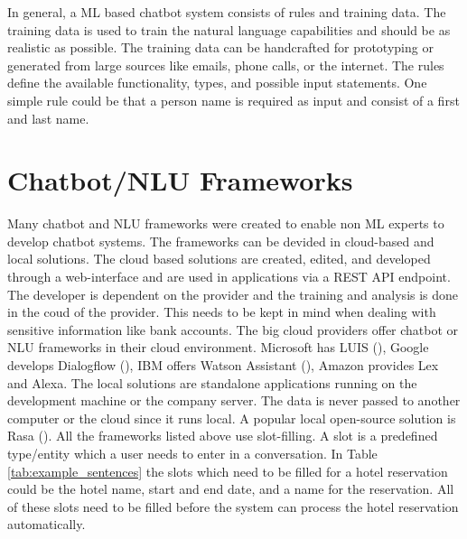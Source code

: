 In general, a ML based chatbot system consists of rules and training data.
The training data is used to train the natural language capabilities and 
should be as realistic as possible.
The training data can be handcrafted for prototyping or generated from large sources like emails, phone calls,
or the internet.
The rules define the available functionality, types, and possible input statements.
One simple rule could be that a person name is required as input and consist of a first and last name.


\section{Chatbot/NLU Frameworks}
Many chatbot and NLU frameworks were created to enable non ML experts to 
develop chatbot systems.
The frameworks can be devided in cloud-based and local solutions.
The cloud based solutions are created, edited, and developed through a web-interface 
and are used in applications via a REST API endpoint.
The developer is dependent on the provider and the training and analysis is done 
in the coud of the provider. This needs to be kept in mind when dealing with
 sensitive information like bank accounts.
The big cloud providers offer chatbot or NLU frameworks in their cloud environment.
Microsoft has LUIS (\citet{luis2015williams, luisdocs}),
Google develops Dialogflow (\citet{dialogflow}),
IBM offers Watson Assistant (\citet{watsonassistant}),
Amazon provides Lex and Alexa.
The local solutions are standalone applications running on the development machine or 
the company server.
The data is never passed to another computer or the cloud since it runs local.
A popular local open-source solution is Rasa (\citet{rasabocklisch2017,rasa}). 
All the frameworks listed above use slot-filling.
A slot is a predefined type/entity which a user needs to enter in a conversation.
In Table \ref{tab:example_sentences} the slots which need to be filled for a hotel 
reservation could be the hotel name, start and end date, and a name for the 
reservation.
All of these slots need to be filled before the system can process the hotel 
reservation automatically.


